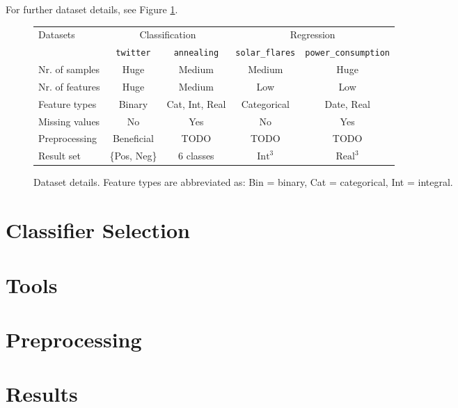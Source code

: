 \documentclass[a4paper,10pt]{article}
\newcommand{\annealing}{\texttt{annealing}}
\newcommand{\powerconsumption}{\texttt{power\_consumption}}
\newcommand{\solarflares}{\texttt{solar\_flares}}
\newcommand{\twitter}{\texttt{twitter}}
\begin{document}
For further dataset details, see Figure \ref{fig:datasets}.

\begin{comment}
solar flares:
* interesting since regression on categorical data

powerconsumption:
* coupled attributes -> reduce only to time. choice of preprocessing important.
\end{comment}


\begin{figure}[h]
\centering
\begin{tabular}{lcccc}
\toprule
\multirow{2}[4]{*}{Datasets} & \multicolumn{2}{c}{Classification} & \multicolumn{2}{c}{Regression} \\
\cmidrule(l){2-3} \cmidrule(l){4-5}
                & \twitter     & \annealing     & \solarflares   & \powerconsumption \\
\midrule
Nr. of samples  & Huge         & Medium         & Medium         & Huge              \\
Nr. of features & Huge         & Medium         & Low            & Low               \\
Feature types   & Binary       & Cat, Int, Real & Categorical    & Date, Real        \\
Missing values  & No           & Yes            & No             & Yes               \\
Preprocessing   & Beneficial   & TODO           & TODO           & TODO              \\
Result set      & \{Pos, Neg\} & 6 classes      & $\text{Int}^3$ & $\text{Real}^3$   \\
\bottomrule
\end{tabular}
\caption{Dataset details. Feature types are abbreviated as: Bin = binary, Cat = categorical, Int = integral. \label{fig:datasets}}
\end{figure}

\section{Classifier Selection}


\section{Tools}


\section{Preprocessing} %


\section{Results}

\end{document}
